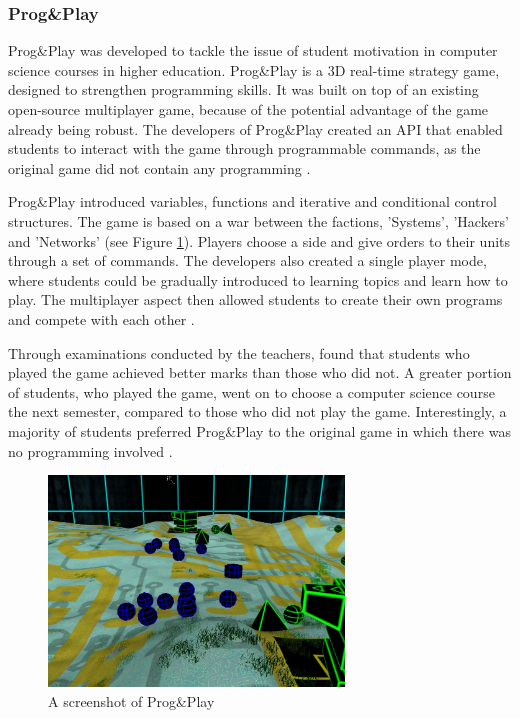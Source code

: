 \documentclass[a4paper,11.5pt]{report}
\numberwithin{figure}{section}
\numberwithin{table}{section}
\numberwithin{equation}{section}
\numberwithin{equation}{section}
\begin{document}
\subsubsection*{Prog\&Play}

Prog\&Play was developed to tackle the issue of student motivation in computer science courses in higher education. Prog\&Play is a 3D real-time strategy game, designed to strengthen programming skills. It was built on top of an existing open-source multiplayer game, because of the potential advantage of the game already being robust. The developers of Prog\&Play created an API that enabled students to interact with the game through programmable commands, as the original game did not contain any programming \citep{muratet2011}.

Prog\&Play introduced variables, functions and iterative and conditional control structures. The game is based on a war between the factions, 'Systems', 'Hackers' and 'Networks' (see Figure \ref{fig:ProgAndPlay-Example}). Players choose a side and give orders to their units through a set of commands. The developers also created a single player mode, where students could be gradually introduced to learning topics and learn how to play. The multiplayer aspect then allowed students to create their own programs and compete with each other \citep{muratet2011}.

Through examinations conducted by the teachers, \citeauthor{muratet2011} found that students who played the game achieved better marks than those who did not. A greater portion of students, who played the game, went on to choose a computer science course the next semester, compared to those who did not play the game. Interestingly, a majority of students preferred Prog\&Play to the original game in which there was no programming involved \citep{muratet2011}.

\begin{figure}[H]
 \centering
    \includegraphics[width=0.7\textwidth]{ProgAndPlay-Example}
       \captionsetup{justification=centering}
\caption{A screenshot of Prog\&Play {\citep{progplaywebsite}}}
\label{fig:ProgAndPlay-Example}
\end{figure}
\end{document}
